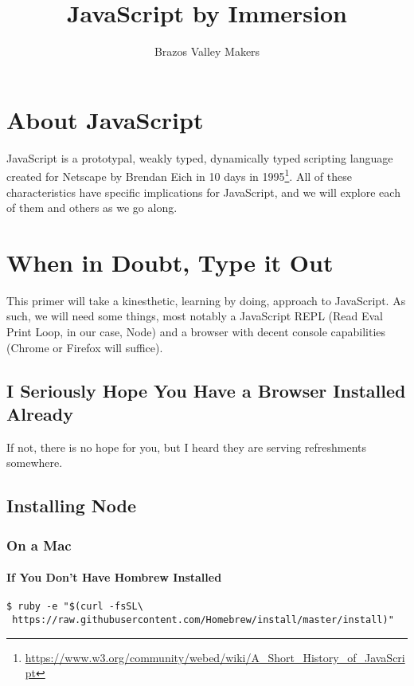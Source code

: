\documentclass{article}
\begin{document}
\title{JavaScript by Immersion}
\author{Brazos Valley Makers}

\maketitle

\section{About JavaScript}
JavaScript is a prototypal, weakly typed, dynamically typed scripting language created for Netscape by Brendan Eich in 10 days in 1995\footnote{\url{ https://www.w3.org/community/webed/wiki/A_Short_History_of_JavaScript}}. All of these characteristics have specific implications for JavaScript, and we will explore each of them and others as we go along.

\section{When in Doubt, Type it Out}
This primer will take a kinesthetic, learning by doing, approach to JavaScript. As such, we will need some things, most notably a JavaScript REPL (Read Eval Print Loop, in our case, Node) and a browser with decent console capabilities (Chrome or Firefox will suffice).

\subsection{I Seriously Hope You Have a Browser Installed Already}
If not, there is no hope for you, but I heard they are serving refreshments somewhere.

\subsection{Installing Node}

\subsubsection{On a Mac}

\paragraph{If You Don’t Have Hombrew Installed}

\begin{lstlisting}
$ ruby -e "$(curl -fsSL\
 https://raw.githubusercontent.com/Homebrew/install/master/install)"
\end{lstlisting}
\end{document}
